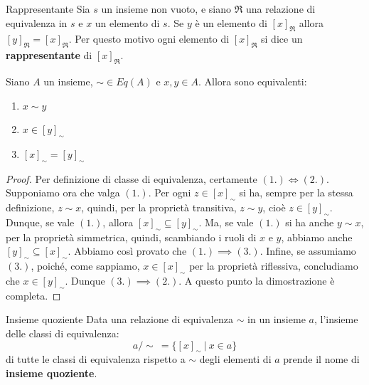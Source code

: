 \begin{defbox}{Rappresentante}
	Sia $s$ un insieme non vuoto, e siano $\mathfrak{R}$ una relazione di equivalenza in $s$ e $x$ un elemento di $s$. Se $y$ è un elemento di $[x]_{\mathfrak{R}}$ allora $[y]_{\mathfrak{R}}=[x]_{\mathfrak{R}}$. Per questo motivo ogni elemento di $[x]_{\mathfrak{R}}$ si dice un \textbf{rappresentante} di $[x]_{\mathfrak{R}}$.
\end{defbox}

\begin{lemmabox}\label{lemma:prop_classi_equivalenza1}
	Siano $A$ un insieme, $\sim \in Eq(A)$ e $x,y \in A$. Allora sono equivalenti:
	\begin{enumerate}
		\item $x \sim y$
		\item $x \in [y]_{\sim}$
		\item $[x]_{\sim} = [y]_{\sim}$
	\end{enumerate}
\end{lemmabox}

\begin{proof}
	Per definizione di classe di equivalenza, certamente $(1.) \iff (2.)$. Supponiamo ora che valga $(1.)$. Per ogni $z \in [x]_{\sim}$ si ha, sempre per la stessa definizione, $z \sim x$, quindi, per la proprietà transitiva, $z \sim y$, cioè $z \in [y]_{\sim}$. Dunque, se vale $(1.)$, allora $[x]_{\sim} \subseteq [y]_{\sim}$. Ma, se vale $(1.)$ si ha anche $y \sim x$, per la proprietà simmetrica, quindi, scambiando i ruoli di $x$ e $y$, abbiamo anche $[y]_{\sim} \subseteq [x]_{\sim}$. Abbiamo così provato che $(1.) \implies (3.)$. Infine, se assumiamo $(3.)$, poiché, come sappiamo, $x \in [x]_{\sim}$ per la proprietà riflessiva, concludiamo che $x \in [y]_{\sim}$. Dunque $(3.) \implies (2.)$. A questo punto la dimostrazione è completa.
\end{proof}

\begin{defbox}{Insieme quoziente}
	Data una relazione di equivalenza $\sim$ in un insieme $a$, l'insieme delle classi di equivalenza:
	\begin{equation}
		a/{\sim}  \ = \{[x]_{\sim}\ | \ x \in a\}
	\end{equation}
	di tutte le classi di equivalenza rispetto a $\sim$ degli elementi di $a$ prende il nome di \textbf{insieme quoziente}.
\end{defbox}

